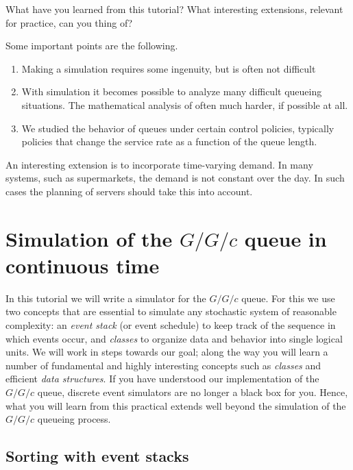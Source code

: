\documentclass{scrartcl}
\begin{document}
\begin{exercise}
  What have you learned from this tutorial? What interesting extensions, relevant for practice,  can you thing of?
  \begin{solution}
    Some important points are the following.
    \begin{enumerate}
    \item  Making a  simulation requires some ingenuity, but is often not difficult
    \item With simulation it becomes possible to analyze many difficult queueing situations. The mathematical analysis of often much harder, if possible at all.
    \item We studied the behavior of queues under certain control policies, typically policies that change the service rate as a function of the queue length.
    \end{enumerate}

An interesting extension is to incorporate time-varying demand. In many systems, such as supermarkets, the demand is not constant over the day. In such cases the planning of servers should take this into account. 

  \end{solution}
\end{exercise}

\clearpage

\section{Simulation of the $G/G/c$ queue in continuous time}
\label{sec:ggc-continuous-time}

In this tutorial we will write a simulator for the $G/G/c$ queue. For this we use two concepts that are essential to simulate any stochastic system of reasonable complexity: an \emph{event stack} (or event schedule) to keep track of the sequence in which  events occur,  and \emph{classes} to organize data and behavior into single logical units.  We will work in steps  towards our goal; along the way you will learn a number of fundamental and highly interesting concepts such as \emph{classes}  and efficient \emph{data structures}.  If you have understood our implementation of the $G/G/c$ queue, discrete event simulators are no longer a black box for you. Hence, what you will learn from this practical extends well beyond the simulation of the $G/G/c$ queueing process. 


\subsection{Sorting with event stacks}
\label{sec:event-stacks}
\end{document}
